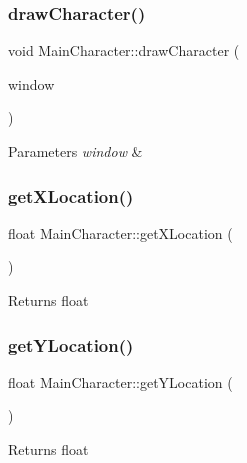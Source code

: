 \subsubsection{\texorpdfstring{drawCharacter()}{drawCharacter()}}
{\footnotesize\ttfamily void Main\+Character\+::draw\+Character (\begin{DoxyParamCaption}\item[{sf\+::\+Render\+Window \&}]{window }\end{DoxyParamCaption})}


\begin{DoxyParams}{Parameters}
{\em window} & \\
\hline
\end{DoxyParams}
\mbox{\label{classMainCharacter_a48c6e280e68d400e3eeac2f33fb194ff}} 
\subsubsection{\texorpdfstring{getXLocation()}{getXLocation()}}
{\footnotesize\ttfamily float Main\+Character\+::get\+X\+Location (\begin{DoxyParamCaption}{ }\end{DoxyParamCaption})}

\begin{DoxyReturn}{Returns}
float 
\end{DoxyReturn}
\mbox{\label{classMainCharacter_aa802ffc7d85805d5dffc4d3700fcee7d}} 
\subsubsection{\texorpdfstring{getYLocation()}{getYLocation()}}
{\footnotesize\ttfamily float Main\+Character\+::get\+Y\+Location (\begin{DoxyParamCaption}{ }\end{DoxyParamCaption})}

\begin{DoxyReturn}{Returns}
float 
\end{DoxyReturn}
\mbox{\label{classMainCharacter_accfd0235b5f57d38be77643e979c893d}} 
